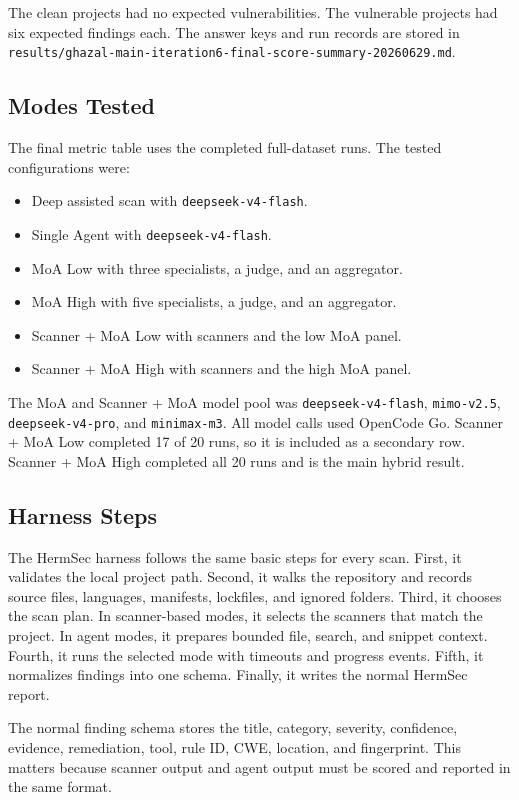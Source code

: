 \documentclass[sigconf,nonacm]{acmart}
\newcommand{\ResultsPath}{\texttt{results/ghazal-main-iteration6-final-score-summary-20260629.md}}
\begin{document}
The clean projects had no expected vulnerabilities. The vulnerable projects had six expected findings each. The answer keys and run records are stored in \ResultsPath.

\subsection{Modes Tested}
The final metric table uses the completed full-dataset runs. The tested configurations were:

\begin{itemize}
  \item Deep assisted scan with \texttt{deepseek-v4-flash}.
  \item Single Agent with \texttt{deepseek-v4-flash}.
  \item MoA Low with three specialists, a judge, and an aggregator.
  \item MoA High with five specialists, a judge, and an aggregator.
  \item Scanner + MoA Low with scanners and the low MoA panel.
  \item Scanner + MoA High with scanners and the high MoA panel.
\end{itemize}

The MoA and Scanner + MoA model pool was \texttt{deepseek-v4-flash}, \texttt{mimo-v2.5}, \texttt{deepseek-v4-pro}, and \texttt{minimax-m3}. All model calls used OpenCode Go. Scanner + MoA Low completed 17 of 20 runs, so it is included as a secondary row. Scanner + MoA High completed all 20 runs and is the main hybrid result.

\subsection{Harness Steps}
The HermSec harness follows the same basic steps for every scan. First, it validates the local project path. Second, it walks the repository and records source files, languages, manifests, lockfiles, and ignored folders. Third, it chooses the scan plan. In scanner-based modes, it selects the scanners that match the project. In agent modes, it prepares bounded file, search, and snippet context. Fourth, it runs the selected mode with timeouts and progress events. Fifth, it normalizes findings into one schema. Finally, it writes the normal HermSec report.

The normal finding schema stores the title, category, severity, confidence, evidence, remediation, tool, rule ID, CWE, location, and fingerprint. This matters because scanner output and agent output must be scored and reported in the same format.
\end{document}
